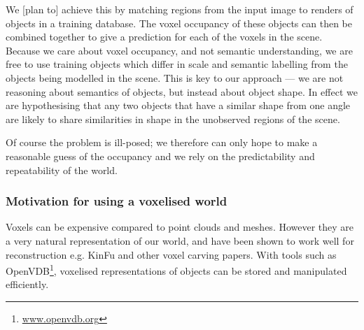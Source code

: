 \documentclass[10pt,a4paper, twocolumn]{article}
\makeatletter
\newcommand*{\eg}{e.g.\@\xspace}
\makeatother
\begin{document}
We [plan to] achieve this by matching regions from the input image to renders of objects in a training database.
The voxel occupancy of these objects can then be combined together to give a prediction for each of the voxels in the scene. 
Because we care about voxel occupancy, and not semantic understanding, we are free to use training objects which differ in scale and semantic labelling from the objects being modelled in the scene. 
This is key to our approach --- we are not reasoning about semantics of objects, but instead about object shape.
In effect we are hypothesising that any two objects that have a similar shape from one angle are likely to share similarities in shape in the unobserved regions of the scene.

Of course the problem is ill-posed; we therefore can only hope to make a reasonable guess of the occupancy and we rely on the predictability and repeatability of the world.





\subsubsection{Motivation for using a voxelised world}

Voxels can be expensive compared to point clouds and meshes. 
However they are a very natural representation of our world, and have been shown to work well for reconstruction \eg KinFu and other voxel carving papers. 
With tools such as OpenVDB\footnote{\url{www.openvdb.org}}, voxelised representations of objects can be stored and manipulated efficiently.

\end{document}
